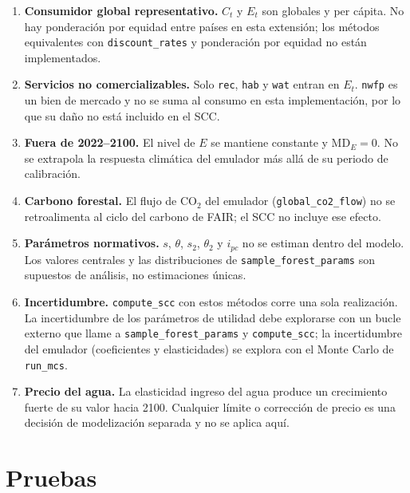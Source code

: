 \documentclass[11pt,a4paper]{article}
\begin{document}
\begin{enumerate}
  \item \textbf{Consumidor global representativo.} \(C_t\) y \(E_t\) son
        globales y per cápita. No hay ponderación por equidad entre países en
        esta extensión; los métodos equivalentes con \texttt{discount\_rates}
        y ponderación por equidad no están implementados.
  \item \textbf{Servicios no comercializables.} Solo \texttt{rec},
        \texttt{hab} y \texttt{wat} entran en \(E_t\). \texttt{nwfp} es un
        bien de mercado y no se suma al consumo en esta implementación, por lo
        que su daño no está incluido en el SCC.
  \item \textbf{Fuera de 2022--2100.} El nivel de \(E\) se mantiene constante
        y \(\mathrm{MD}_E=0\). No se extrapola la respuesta climática del
        emulador más allá de su periodo de calibración.
  \item \textbf{Carbono forestal.} El flujo de CO\(_2\) del emulador
        (\texttt{global\_co2\_flow}) no se retroalimenta al ciclo del carbono
        de FAIR; el SCC no incluye ese efecto.
  \item \textbf{Parámetros normativos.} \(s\), \(\theta\), \(s_2\), \(\theta_2\)
        y \(i_{pc}\) no se estiman dentro del modelo. Los valores centrales y
        las distribuciones de \texttt{sample\_forest\_params} son supuestos
        de análisis, no estimaciones únicas.
  \item \textbf{Incertidumbre.} \texttt{compute\_scc} con estos métodos corre
        una sola realización. La incertidumbre de los parámetros de utilidad
        debe explorarse con un bucle externo que llame a
        \texttt{sample\_forest\_params} y \texttt{compute\_scc}; la
        incertidumbre del emulador (coeficientes y elasticidades) se explora
        con el Monte Carlo de \texttt{run\_mcs}.
  \item \textbf{Precio del agua.} La elasticidad ingreso del agua produce un
        crecimiento fuerte de su valor hacia 2100. Cualquier límite o
        corrección de precio es una decisión de modelización separada y no se
        aplica aquí.
\end{enumerate}

\section{Pruebas}
\end{document}
